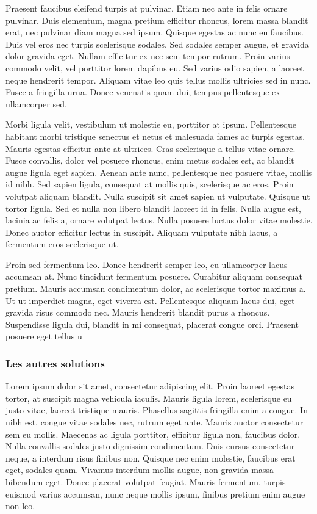 \documentclass{report}
\begin{document}
Praesent faucibus eleifend turpis at pulvinar. Etiam nec ante in felis ornare pulvinar. Duis elementum, magna pretium efficitur rhoncus, lorem massa blandit erat, nec pulvinar diam magna sed ipsum. Quisque egestas ac nunc eu faucibus. Duis vel eros nec turpis scelerisque sodales. Sed sodales semper augue, et gravida dolor gravida eget. Nullam efficitur ex nec sem tempor rutrum. Proin varius commodo velit, vel porttitor lorem dapibus eu. Sed varius odio sapien, a laoreet neque hendrerit tempor. Aliquam vitae leo quis tellus mollis ultricies sed in nunc. Fusce a fringilla urna. Donec venenatis quam dui, tempus pellentesque ex ullamcorper sed.

Morbi ligula velit, vestibulum ut molestie eu, porttitor at ipsum. Pellentesque habitant morbi tristique senectus et netus et malesuada fames ac turpis egestas. Mauris egestas efficitur ante at ultrices. Cras scelerisque a tellus vitae ornare. Fusce convallis, dolor vel posuere rhoncus, enim metus sodales est, ac blandit augue ligula eget sapien. Aenean ante nunc, pellentesque nec posuere vitae, mollis id nibh. Sed sapien ligula, consequat at mollis quis, scelerisque ac eros. Proin volutpat aliquam blandit. Nulla suscipit sit amet sapien ut vulputate. Quisque ut tortor ligula. Sed et nulla non libero blandit laoreet id in felis. Nulla augue est, lacinia ac felis a, ornare volutpat lectus. Nulla posuere luctus dolor vitae molestie. Donec auctor efficitur lectus in suscipit. Aliquam vulputate nibh lacus, a fermentum eros scelerisque ut.

Proin sed fermentum leo. Donec hendrerit semper leo, eu ullamcorper lacus accumsan at. Nunc tincidunt fermentum posuere. Curabitur aliquam consequat pretium. Mauris accumsan condimentum dolor, ac scelerisque tortor maximus a. Ut ut imperdiet magna, eget viverra est. Pellentesque aliquam lacus dui, eget gravida risus commodo nec. Mauris hendrerit blandit purus a rhoncus. Suspendisse ligula dui, blandit in mi consequat, placerat congue orci. Praesent posuere eget tellus u

\subsubsection{Les autres solutions}
Lorem ipsum dolor sit amet, consectetur adipiscing elit. Proin laoreet egestas tortor, at suscipit magna vehicula iaculis. Mauris ligula lorem, scelerisque eu justo vitae, laoreet tristique mauris. Phasellus sagittis fringilla enim a congue. In nibh est, congue vitae sodales nec, rutrum eget ante. Mauris auctor consectetur sem eu mollis. Maecenas ac ligula porttitor, efficitur ligula non, faucibus dolor. Nulla convallis sodales justo dignissim condimentum. Duis cursus consectetur neque, a interdum risus finibus non. Quisque nec enim molestie, faucibus erat eget, sodales quam. Vivamus interdum mollis augue, non gravida massa bibendum eget. Donec placerat volutpat feugiat. Mauris fermentum, turpis euismod varius accumsan, nunc neque mollis ipsum, finibus pretium enim augue non leo.
\end{document}
